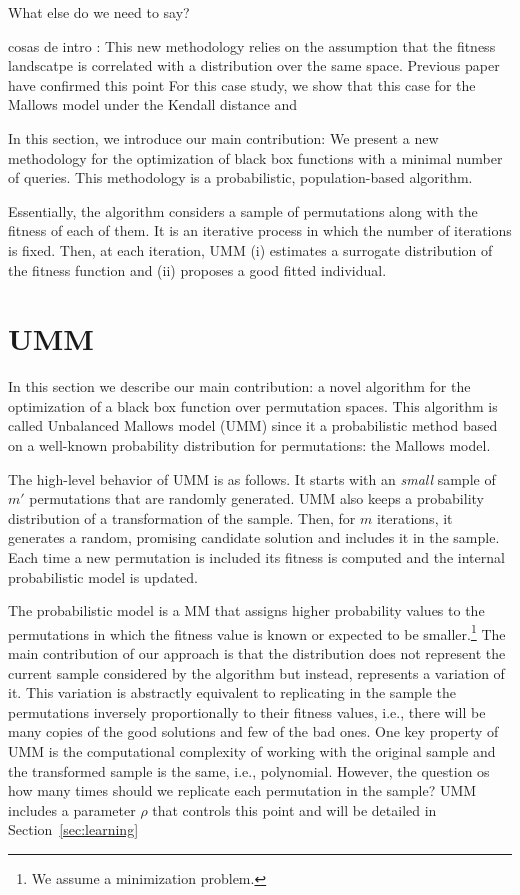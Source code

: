 \documentclass[runningheads]{llncs}
\begin{document}
What else do we need to say?

\newcommand{\minit}{\ensuremath{m_\text{ini}}\xspace}

\newcommand{\FEmax}{\ensuremath{\textit{FE}_{\max}}}

cosas de intro : 
This new methodology relies on the assumption that the fitness landscatpe is correlated with a distribution over the same space. 
Previous paper have confirmed this point
For this case study, we show that this case for the Mallows model under the Kendall distance and 



In this section, we introduce our main contribution: We present a new methodology for the optimization of black box functions with a minimal number of queries. This methodology is a probabilistic, population-based algorithm. 

Essentially, the algorithm  considers a sample of permutations along with the fitness of each of them. It is an iterative process in which the number of iterations is fixed. 
Then, at each iteration, UMM (i) estimates a surrogate distribution of the fitness function and (ii) proposes a good fitted individual. 


\section{UMM }
In this section we describe our main contribution: a novel algorithm for the optimization of a black box function over permutation spaces. This algorithm is called Unbalanced Mallows model (UMM) since it a probabilistic method based on a well-known probability distribution for permutations: the Mallows model. 


The high-level behavior of UMM is as follows. It starts with an \textit{small} sample of $m'$ permutations that are randomly generated. UMM also keeps a probability distribution of a transformation of the sample. Then, for $m$ iterations, it generates a random, promising candidate solution and includes it in the sample. Each time a new permutation is included its fitness is computed and the internal probabilistic model is updated. 

The probabilistic model is a MM that assigns higher probability values to the permutations in which the fitness value is known or expected to be smaller.\footnote{We assume a minimization problem.} The main contribution of our approach is that the distribution does not represent the current sample considered by the algorithm but instead, represents a variation of it. This variation is abstractly equivalent to replicating in the sample the permutations inversely proportionally to their fitness values, i.e., there will be many copies of the good solutions and few of the bad ones. One key property of UMM is the computational complexity of working with the original sample and the transformed sample is the same, i.e., polynomial. However, the question os how many times should we replicate each permutation in the sample? UMM includes a parameter $\rho$ that controls this point and will be detailed in Section~\ref{sec:learning}
\end{document}

